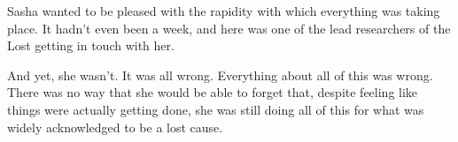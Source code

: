 Sasha wanted to be pleased with the rapidity with which everything was taking place. It hadn't even been a week, and here was one of the lead researchers of the Lost getting in touch with her.

And yet, she wasn't. It was all wrong. Everything about all of this was wrong. There was no way that she would be able to forget that, despite feeling like things were actually getting done, she was still doing all of this for what was widely acknowledged to be a lost cause.
